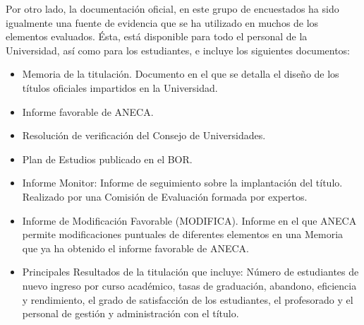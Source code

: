\documentclass[spanish]{textolivre}
\begin{document}
Por otro lado, la documentación oficial, en este grupo de encuestados ha sido igualmente una fuente de evidencia que se ha utilizado en muchos de los elementos evaluados. Ésta, está disponible para todo el personal de la Universidad, así como para los estudiantes, e incluye los siguientes documentos:

\begin{itemize}
 \item Memoria de la titulación. Documento en el que se detalla el diseño de los títulos oficiales impartidos en la Universidad.
 \item Informe favorable de ANECA. 
 \item Resolución de verificación del Consejo de Universidades.
 \item Plan de Estudios publicado en el BOR. 
 \item Informe Monitor: Informe de seguimiento sobre la implantación del título. Realizado por una Comisión de Evaluación formada por expertos. 
 \item Informe de Modificación Favorable (MODIFICA). Informe en el que ANECA permite modificaciones puntuales de diferentes elementos en una Memoria que ya ha obtenido el informe favorable de ANECA.
 \item Principales Resultados de la titulación que incluye: Número de estudiantes de nuevo ingreso por curso académico, tasas de graduación, abandono, eficiencia y rendimiento, el grado de satisfacción de los estudiantes, el profesorado y el personal de gestión y administración con el título. 
\end{itemize}
\end{document}
